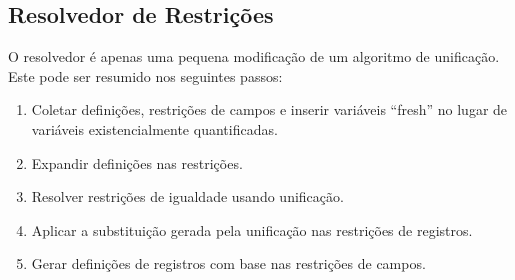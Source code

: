 \documentclass[a4paper,8pt]{article}
\begin{document}
     \subsection{Resolvedor de Restrições}\label{constraintsolver}

     O resolvedor é apenas uma pequena modificação de um algoritmo de
     unificação. Este pode ser resumido nos seguintes passos:
     \begin{enumerate}
          \item Coletar definições, restrições de campos e inserir
            variáveis ``fresh'' no lugar de variáveis existencialmente
            quantificadas.
          \item Expandir definições nas restrições.
          \item Resolver restrições de igualdade usando unificação.
          \item Aplicar a substituição gerada pela unificação nas
            restrições de registros.
          \item Gerar definições de registros com base nas restrições
            de campos.
     \end{enumerate}









\end{document}
